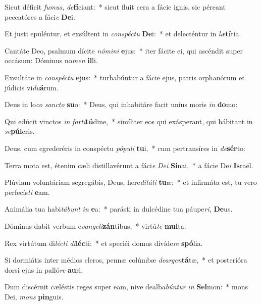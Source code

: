 \item Sicut déficit \textit{fu}\textit{mus}, \textit{de}\textbf{fí}ciant:~* sicut fluit cera a fácie ignis, sic péreant peccatóres a fáci\textit{e} \textbf{De}i.
\item Et justi epuléntur, et exsúltent in \textit{con}\textit{spéc}\textit{tu} \textbf{De}i:~* et delecténtur in \textit{læ}\textbf{tí}tia.
\item Cantáte Deo, psalmum dícite \textit{nó}\textit{mi}\textit{ni} \textbf{e}jus:~* iter fácite ei, qui ascéndit super occásum: Dóminus no\textit{men} \textbf{il}li.
\item Exsultáte in \textit{con}\textit{spéc}\textit{tu} \textbf{e}jus:~* turbabúntur a fácie ejus, patris orphanórum et júdicis vi\textit{du}\textbf{á}rum.
\item Deus in lo\textit{co} \textit{sanc}\textit{to} \textbf{su}o:~* Deus, qui inhabitáre facit uníus moris \textit{in} \textbf{do}mo:
\item Qui edúcit vinctos \textit{in} \textit{for}\textit{ti}\textbf{tú}dine,~* simíliter eos qui exásperant, qui hábitant in \textit{se}\textbf{púl}cris.
\item Deus, cum egrederéris in conspéctu \textit{pó}\textit{pu}\textit{li} \textbf{tu}i,~* cum pertransíres in \textit{de}\textbf{sér}to:
\item Terra mota est, étenim cæli distillavérunt a fáci\textit{e} \textit{De}\textit{i} \textbf{Sí}nai,~* a fácie De\textit{i} \textbf{Is}raël.
\item Plúviam voluntáriam segregábis, Deus, here\textit{di}\textit{tá}\textit{ti} \textbf{tu}æ:~* et infirmáta est, tu vero perfecís\textit{ti} \textbf{e}am.
\item Animália tua habi\textit{tá}\textit{bunt} \textit{in} \textbf{e}a:~* parásti in dulcédine tua páupe\textit{ri}, \textbf{De}us.
\item Dóminus dabit verbum e\textit{van}\textit{ge}\textit{li}\textbf{zán}tibus,~* virtú\textit{te} \textbf{mul}ta.
\item Rex virtútum di\textit{léc}\textit{ti} \textit{di}\textbf{léc}ti:~* et speciéi domus divíde\textit{re} \textbf{spó}lia.
\item Si dormiátis inter médios cleros, pennæ colúmbæ \textit{de}\textit{ar}\textit{gen}\textbf{tá}tæ,~* et posterióra dorsi ejus in palló\textit{re} \textbf{au}ri.
\item Dum discérnit cæléstis reges super eam, nive dealba\textit{bún}\textit{tur} \textit{in} \textbf{Sel}mon:~* mons Dei, \textit{mons} \textbf{pin}guis.
